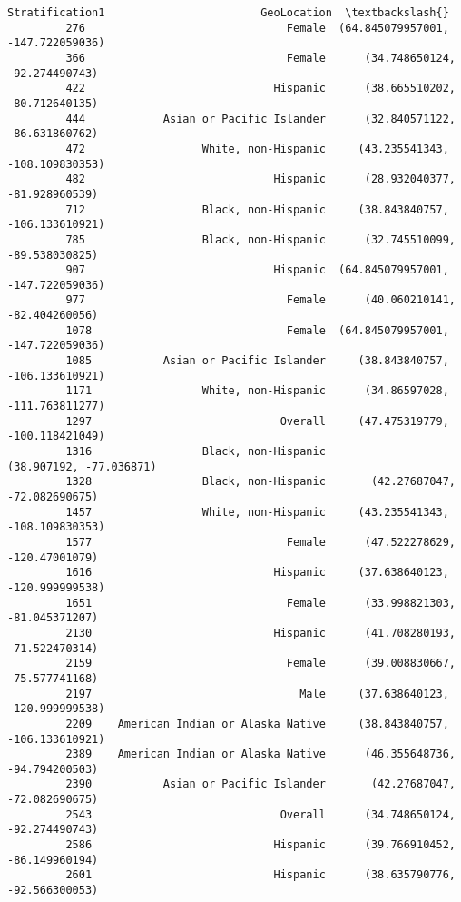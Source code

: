 \documentclass[11pt]{article}
\begin{document}
\begin{Verbatim}[commandchars=\\\{\}]
                                  Stratification1                        GeoLocation  \textbackslash{}
         276                               Female  (64.845079957001, -147.722059036)   
         366                               Female      (34.748650124, -92.274490743)   
         422                             Hispanic      (38.665510202, -80.712640135)   
         444            Asian or Pacific Islander      (32.840571122, -86.631860762)   
         472                  White, non-Hispanic     (43.235541343, -108.109830353)   
         482                             Hispanic      (28.932040377, -81.928960539)   
         712                  Black, non-Hispanic     (38.843840757, -106.133610921)   
         785                  Black, non-Hispanic      (32.745510099, -89.538030825)   
         907                             Hispanic  (64.845079957001, -147.722059036)   
         977                               Female      (40.060210141, -82.404260056)   
         1078                              Female  (64.845079957001, -147.722059036)   
         1085           Asian or Pacific Islander     (38.843840757, -106.133610921)   
         1171                 White, non-Hispanic      (34.86597028, -111.763811277)   
         1297                             Overall     (47.475319779, -100.118421049)   
         1316                 Black, non-Hispanic            (38.907192, -77.036871)   
         1328                 Black, non-Hispanic       (42.27687047, -72.082690675)   
         1457                 White, non-Hispanic     (43.235541343, -108.109830353)   
         1577                              Female      (47.522278629, -120.47001079)   
         1616                            Hispanic     (37.638640123, -120.999999538)   
         1651                              Female      (33.998821303, -81.045371207)   
         2130                            Hispanic      (41.708280193, -71.522470314)   
         2159                              Female      (39.008830667, -75.577741168)   
         2197                                Male     (37.638640123, -120.999999538)   
         2209    American Indian or Alaska Native     (38.843840757, -106.133610921)   
         2389    American Indian or Alaska Native      (46.355648736, -94.794200503)   
         2390           Asian or Pacific Islander       (42.27687047, -72.082690675)   
         2543                             Overall      (34.748650124, -92.274490743)   
         2586                            Hispanic      (39.766910452, -86.149960194)   
         2601                            Hispanic      (38.635790776, -92.566300053)   

\end{Verbatim}
\end{document}
